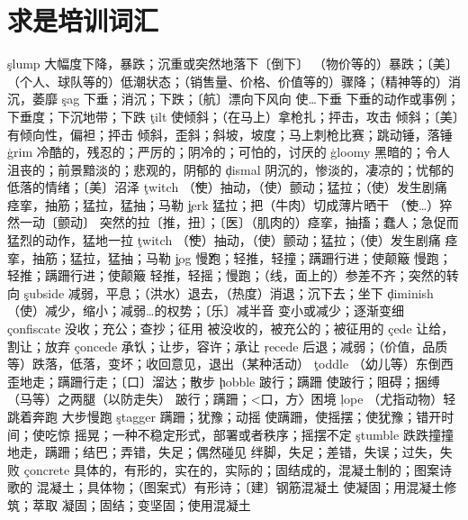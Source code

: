 \section{求是培训词汇}
\begin{multicols}{2}
\c{slump}  \vi 大幅度下降，暴跌；沉重或突然地落下〔倒下〕 \n （物价等的）暴跌；〔美〕（个人、球队等的）低潮状态；（销售量、价格、价值等的）骤降；（精神等的）消沉，萎靡
\c{sag}  \vi 下垂；消沉；下跌；〔航〕漂向下风向 \vt 使…下垂 \n 下垂的动作或事例；下垂度；下沉地带；下跌
\c{tilt}  \vt 使倾斜；（在马上）拿枪扎；抨击，攻击 \vi 倾斜；〔美〕有倾向性，偏袒；抨击 \n 倾斜，歪斜；斜坡，坡度；马上刺枪比赛；跳动锤，落锤
\c{grim}  \a 冷酷的，残忍的；严厉的；阴冷的；可怕的，讨厌的
\c{gloomy}  \a 黑暗的；令人沮丧的；前景黯淡的；悲观的，阴郁的
\c{dismal}  \a 阴沉的，惨淡的，凄凉的；忧郁的 \n 低落的情绪；〔美〕沼泽
\c{twitch}  \v （使）抽动，（使）颤动；猛拉；（使）发生剧痛 \n 痉挛，抽筋；猛拉，猛抽；马勒
\c{jerk}  \vt 猛拉；把（牛肉）切成薄片晒干 \v （使…）猝然一动〔颤动〕 \n 突然的拉〔推，扭〕；〔医〕（肌肉的）痉挛，抽搐；蠢人；急促而猛烈的动作，猛地一拉
\c{twitch}  \v （使）抽动，（使）颤动；猛拉；（使）发生剧痛 \n 痉挛，抽筋；猛拉，猛抽；马勒
\c{jog}  \v 慢跑；轻推，轻撞；蹒跚行进；使颠簸 \vt 慢跑；轻推；蹒跚行进；使颠簸 \n 轻推，轻摇；慢跑；（线，面上的）参差不齐；突然的转向
\c{subside}  \vi 减弱，平息；（洪水）退去，（热度）消退；沉下去；坐下
\c{diminish}  \vt （使）减少，缩小；减弱…的权势；〔乐〕减半音 \vi 变小或减少；逐渐变细
\c{confiscate}  \vt 没收；充公；查抄；征用 \a 被没收的，被充公的；被征用的
\c{cede}  \vt 让给，割让；放弃
\c{concede}  \v 承认；让步，容许；承让
\c{recede}  \vi 后退；减弱；（价值，品质等）跌落，低落，变坏；收回意见，退出（某种活动）
\c{toddle}  \vi （幼儿等）东倒西歪地走；蹒跚行走；〔口〕溜达；散步
\c{hobble}  \vi 跛行；蹒跚 \vt 使跛行；阻碍；捆缚（马等）之两腿（以防走失） \n 跛行；蹒跚；<口，方〉困境
\c{lope}  \vi （尤指动物）轻跳着奔跑 \n 大步慢跑
\c{stagger}  \vi 蹒跚；犹豫；动摇 \vt 使蹒跚，使摇摆；使犹豫；错开时间；使吃惊 \n 摇晃；一种不稳定形式，部署或者秩序；摇摆不定
\c{stumble}  \vi 跌跌撞撞地走，蹒跚；结巴；弄错，失足；偶然碰见 \n 绊脚，失足；差错，失误；过失，失败
\c{concrete}  \a 具体的，有形的，实在的，实际的；固结成的，混凝土制的；图案诗歌的 \n 混凝土；具体物；（图案式）有形诗；〔建〕钢筋混凝土 \vt 使凝固；用混凝土修筑；萃取 \vi 凝固；固结；变坚固；使用混凝土

\end{multicols}
